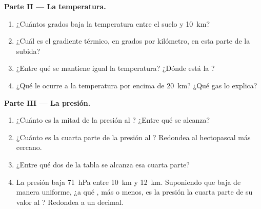 \begin{problem}
\noindent\textbf{Parte II --- La temperatura.}\par\nopagebreak
\begin{enumerate}[resume, beginpenalty=10000]
  \item ¿Cuántos grados baja la temperatura entre el suelo y \qty{10}{km}?
  \item ¿Cuál es el gradiente térmico, en grados por kilómetro, en esta
        parte de la subida?
  \item ¿Entre qué  se mantiene igual la temperatura? ¿Dónde está
        la ?
  \item ¿Qué le ocurre a la temperatura por encima de \qty{20}{km}? ¿Qué
        gas lo explica?
\end{enumerate}

\noindent\textbf{Parte III --- La presión.}\par\nopagebreak
\begin{enumerate}[resume, beginpenalty=10000]
  \item ¿Cuánto es la mitad de la presión al ? ¿Entre qué
         se alcanza?
  \item ¿Cuánto es la cuarta parte de la presión al ? Redondea
        al hectopascal más cercano.
  \item ¿Entre qué dos  de la tabla se alcanza esa cuarta parte?
  \item La presión baja \qty{71}{hPa} entre \qty{10}{km} y \qty{12}{km}.
        Suponiendo que baja de manera uniforme, ¿a qué , más o menos,
        es la presión la cuarta parte de su valor al ?
        Redondea a un decimal.
\end{enumerate}
\end{problem}
